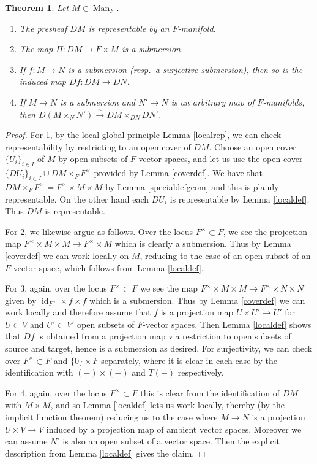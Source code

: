 \documentclass[12pt]{article}
\newtheorem{theorem}{Theorem}[section]
\begin{document}
\begin{theorem}\label{defrepresentable}
Let $M\in\operatorname{Man}_F$.
\begin{enumerate}
\item The presheaf $DM$ is representable by an $F$-manifold.
\item The map $\Pi:DM\rightarrow F\times M$ is a submersion.
\item If $f:M\rightarrow N$ is a submersion (resp.\ a surjective submersion), then so is the induced map $Df:DM\rightarrow DN$.
\item If $M\rightarrow N$ is a submersion and $N'\rightarrow N$ is an arbitrary map of $F$-manifolds, then $D(M\times_N N')\overset{\sim}{\rightarrow} DM\times_{DN}DN'$.
\end{enumerate}
\end{theorem}
\begin{proof}
For 1, by the local-global principle Lemma \ref{localrep}, we can check representability by restricting to an open cover of $DM$.  Choose an open cover $\{U_i\}_{i\in I}$ of $M$ by open subsets of $F$-vector spaces, and let us use the open cover $\{DU_i\}_{i\in I}\cup DM\times_{F}F^\times$ provided by Lemma \ref{coverdef}.  We have that $DM\times_FF^\times = F^\times \times M\times M$ by Lemma \ref{specialdefgeom} and this is plainly representable.  On the other hand each $DU_i$ is representable by Lemma \ref{localdef}.  Thus $DM$ is representable.

For 2, we likewise argue as follows.  Over the locus $F^\times\subset F$, we see the projection map $F^\times \times M\times M\rightarrow F^\times\times M$ which is clearly a submersion.  Thus by Lemma \ref{coverdef} we can work locally on $M$, reducing to the case of an open subset of an $F$-vector space, which follows from Lemma \ref{localdef}.

For 3, again, over the locus $F^\times\subset F$ we see the map $F^\times\times M\times M\rightarrow F^\times \times N \times N$ given by $\operatorname{id}_{F^\times}\times f\times f$ which is a submersion.  Thus by Lemma \ref{coverdef} we can work locally and therefore assume that $f$ is a projection map $U\times U'\rightarrow U'$ for $U\subset V$ and $U'\subset V'$ open subsets of $F$-vector spaces.  Then Lemma \ref{localdef} shows that $Df$ is obtained from a projection map via restriction to open subsets of source and target, hence is a submersion as desired.  For surjectivity, we can check over $F^\times \subset F$ and $\{0\}\times F$  separately, where it is clear in each case by the identification with $(-)\times (-)$ and $T(-)$ respectively.

For 4, again, over the locus $F^\times\subset F$ this is clear from the identification of $DM$ with $M\times M$, and so Lemma \ref{localdef} lets us work locally, thereby (by the implicit function theorem) reducing us to the case where $M\rightarrow N$ is a projection $U\times V\rightarrow V$ induced by a projection map of ambient vector spaces.  Moreover we can assume $N'$ is also an open subset of a vector space.  Then the explicit description from Lemma \ref{localdef} gives the claim.
\end{proof}
\end{document}
